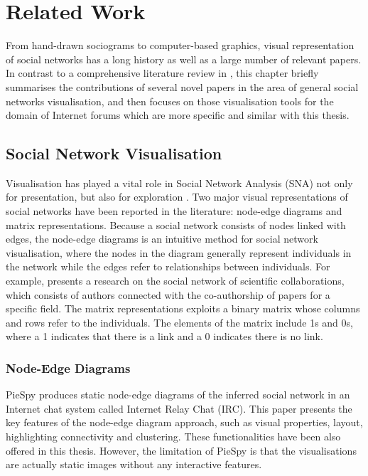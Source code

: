 \chapter{Related Work} \label{Chapter:RelatedWork}

From hand-drawn sociograms to computer-based graphics, visual representation of social networks has a long history as well as a large number of relevant papers. In contrast to a comprehensive literature review in \citep{Chen2010}, this chapter briefly summarises the contributions of several novel papers in the area of general social networks visualisation, and then focuses on those visualisation tools for the domain of Internet forums which are more specific and similar with this thesis.

\section{Social Network Visualisation}

Visualisation has played a vital role in Social Network Analysis (SNA) not only for presentation, but also for exploration \citep{Brandes2008a}. Two major visual representations of social networks have been reported in the literature: node-edge diagrams and matrix representations. Because a social network consists of nodes linked with edges, the node-edge diagrams is an intuitive method for social network visualisation, where the nodes in the diagram generally represent individuals in the network while the edges refer to relationships between individuals. For example, \citep{Newman2004a} presents a research on the social network of scientific collaborations, which consists of authors connected with the co-authorship of papers for a specific field. The matrix representations exploits a binary matrix whose columns and rows refer to the individuals. The elements of the matrix include 1s and 0s, where a 1 indicates that there is a link and a 0 indicates there is no link.

\subsection{Node-Edge Diagrams}
PieSpy \citep{Mutton2004} produces static node-edge diagrams of the inferred social network in an Internet chat system called Internet Relay Chat (IRC). This paper presents the key features of the node-edge diagram approach, such as visual properties, layout, highlighting connectivity and clustering. These functionalities have been also offered in this thesis. However, the limitation of PieSpy is that the visualisations are actually static images without any interactive features.

